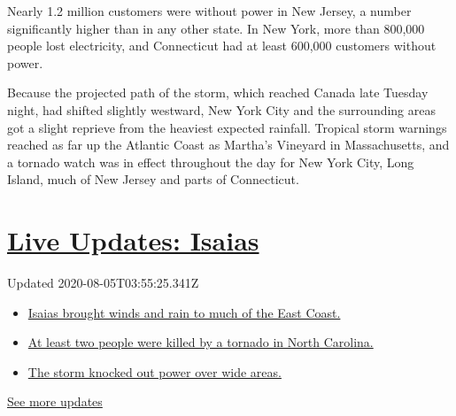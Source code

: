 Nearly 1.2 million customers were without power in New Jersey, a number
significantly higher than in any other state. In New York, more than
800,000 people lost electricity, and Connecticut had at least 600,000
customers without power.

Because the projected path of the storm, which reached Canada late
Tuesday night, had shifted slightly westward, New York City and the
surrounding areas got a slight reprieve from the heaviest expected
rainfall. Tropical storm warnings reached as far up the Atlantic Coast
as Martha's Vineyard in Massachusetts, and a tornado watch was in effect
throughout the day for New York City, Long Island, much of New Jersey
and parts of Connecticut.

\hypertarget{live-updates-isaias}{%
\section{\texorpdfstring{\href{https://www.nytimes.com/2020/08/04/us/isaias-storm-updates.html?action=click\&pgtype=Article\&state=default\&region=MAIN_CONTENT_1\&context=storylines_live_updates}{Live
Updates: Isaias}}{Live Updates: Isaias}}\label{live-updates-isaias}}

Updated 2020-08-05T03:55:25.341Z

\begin{itemize}
\tightlist
\item
  \href{https://www.nytimes.com/2020/08/04/us/isaias-storm-updates.html?action=click\&pgtype=Article\&state=default\&region=MAIN_CONTENT_1\&context=storylines_live_updates\#link-38d68049}{Isaias
  brought winds and rain to much of the East Coast.}
\item
  \href{https://www.nytimes.com/2020/08/04/us/isaias-storm-updates.html?action=click\&pgtype=Article\&state=default\&region=MAIN_CONTENT_1\&context=storylines_live_updates\#link-7961bdbc}{At
  least two people were killed by a tornado in North Carolina.}
\item
  \href{https://www.nytimes.com/2020/08/04/us/isaias-storm-updates.html?action=click\&pgtype=Article\&state=default\&region=MAIN_CONTENT_1\&context=storylines_live_updates\#link-3480f4a1}{The
  storm knocked out power over wide areas.}
\end{itemize}

\href{https://www.nytimes.com/2020/08/04/us/isaias-storm-updates.html?action=click\&pgtype=Article\&state=default\&region=MAIN_CONTENT_1\&context=storylines_live_updates}{See
more updates}

